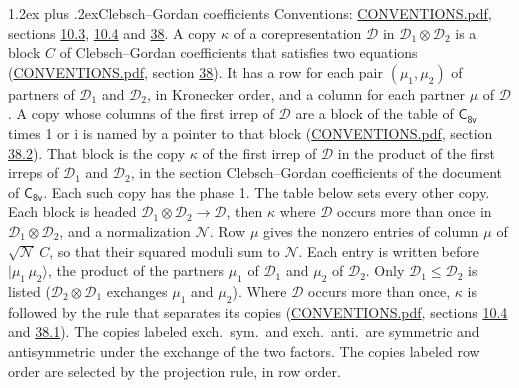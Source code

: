 \documentclass[10pt,a4paper]{article}
\makeatletter
\renewcommand\section{\@startsection{section}{1}{\z@}{-3ex plus -1ex minus -.2ex}%
  {1.2ex plus .2ex}{\normalfont\large\sffamily\bfseries\color{parttitle}}}
\numberwithin{equation}{section}
\newcommand{\grp}[1]{\mathsf{#1}}
\newcommand{\iunit}{\mathrm{i}}
\newcommand{\irrprod}{\otimes}
\newcommand{\mult}{\kappa}
\newcommand{\intx}{\mu}
\newcommand{\cgnorm}{\mathcal{N}}
\newcommand{\prodket}[2]{\lvert {#1}\,{#2}\rangle}
\makeatother
\begin{document}
\section{Clebsch--Gordan coefficients}\label{s:clebsch_gordan}
Conventions: \href{../../CONVENTIONS.pdf}{CONVENTIONS.pdf}, sections \href{../../../rotation/CONVENTIONS.pdf\#conv.10.3}{10.3}, \href{../../../rotation/CONVENTIONS.pdf\#conv.10.4}{10.4} and \href{../../CONVENTIONS.pdf\#conv.38}{38}.
\leavevmode\label{n:index.copy}\label{n:matrix.cg.stored}A copy $\mult$ of a corepresentation $\mathcal{D}$ in $\mathcal{D}_1\irrprod\mathcal{D}_2$ is a block $C$ of Clebsch--Gordan coefficients that satisfies two equations (\href{../../CONVENTIONS.pdf}{CONVENTIONS.pdf}, section \href{../../CONVENTIONS.pdf\#conv.38}{38}). \label{n:index.cg}It has a row for each pair $(\intx_1, \intx_2)$ of partners of $\mathcal{D}_1$ and $\mathcal{D}_2$, in Kronecker order, and a column for each partner $\intx$ of $\mathcal{D}$.
A copy whose columns of the first irrep of $\mathcal{D}$ are a block of the table of $\grp{C_{8v}}$ times 1 or $\iunit$ is named by a pointer to that block (\href{../../CONVENTIONS.pdf}{CONVENTIONS.pdf}, section \href{../../CONVENTIONS.pdf\#conv.38.2}{38.2}). That block is the copy $\mult$ of the first irrep of $\mathcal{D}$ in the product of the first irreps of $\mathcal{D}_1$ and $\mathcal{D}_2$, in the section Clebsch--Gordan coefficients of the document of \href{../../../rotation/data/pdf/C8v.pdf}{$\grp{C_{8v}}$}. Each such copy has the phase 1. The table below sets every other copy.
Each block is headed $\mathcal{D}_1\irrprod\mathcal{D}_2\to\mathcal{D}$, then $\mult$ where $\mathcal{D}$ occurs more than once in $\mathcal{D}_1\irrprod\mathcal{D}_2$, and a normalization $\cgnorm$. Row $\intx$ gives the nonzero entries of column $\intx$ of $\sqrt{\cgnorm}\,C$, so that their squared moduli sum to $\cgnorm$. \label{n:vector.ket.product}Each entry is written before $\prodket{\intx_1}{\intx_2}$, the product of the partners $\intx_1$ of $\mathcal{D}_1$ and $\intx_2$ of $\mathcal{D}_2$. Only $\mathcal{D}_1 \le \mathcal{D}_2$ is listed ($\mathcal{D}_2\irrprod\mathcal{D}_1$ exchanges $\intx_1$ and $\intx_2$).
Where $\mathcal{D}$ occurs more than once, $\mult$ is followed by the rule that separates its copies (\href{../../CONVENTIONS.pdf}{CONVENTIONS.pdf}, sections \href{../../../rotation/CONVENTIONS.pdf\#conv.10.4}{10.4} and \href{../../CONVENTIONS.pdf\#conv.38.1}{38.1}). \label{n:abbreviation.exchange}The copies labeled exch.\ sym.\ and exch.\ anti.\ are symmetric and antisymmetric under the exchange of the two factors. The copies labeled row order are selected by the projection rule, in row order.
\end{document}
